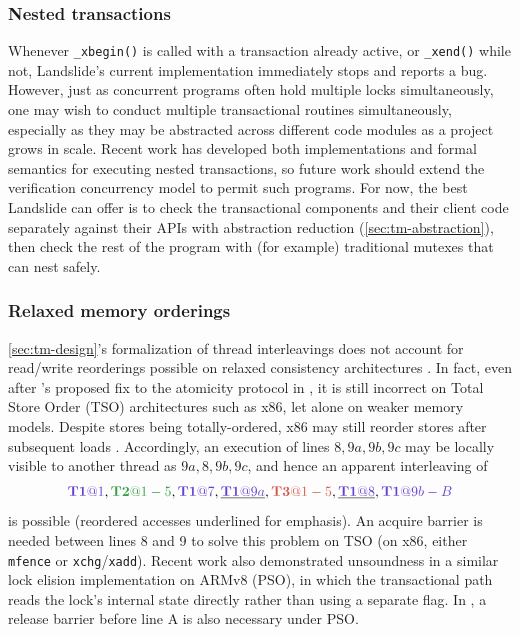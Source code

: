 \subsubsection{Nested transactions}
\label{sec:tm-warpzone-nested}

Whenever {\tt \_xbegin()} is called with a transaction already active, or {\tt \_xend()} while not,
Landslide's current implementation immediately stops and reports a bug.
However, just as concurrent programs often hold multiple locks simultaneously,
one may wish to conduct multiple transactional routines simultaneously,
especially as they may be abstracted across different code modules as a project grows in scale.
Recent work \cite{hybrid-htm-stm,relaxed-transactions-popl} has developed
both implementations and formal semantics for executing nested transactions,
so future work should extend the verification concurrency model to permit such programs.
For now, the best Landslide can offer is to check the transactional components and their client code
separately against their APIs
with abstraction reduction (\cref{sec:tm-abstraction}),
then check the rest of the program with (for example) traditional mutexes that can nest safely.

\subsubsection{Relaxed memory orderings}
\label{sec:tm-warpzone-relaxed}

\cref{sec:tm-design}'s formalization of thread interleavings does not account for read/write reorderings
possible on relaxed consistency architectures \cite{memory-consistency-models}.
In fact,
even after \cite{tm-benchmark-cmu}'s proposed fix to the atomicity protocol in ,
it is still incorrect on Total Store Order (TSO) architectures such as x86,
let alone on weaker memory models.
Despite stores being totally-ordered, x86 may still reorder stores after subsequent loads
\cite{sully-thesis}.
Accordingly, an execution of lines $8,9a,9b,9c$
may be locally visible to another thread as $9a,8,9b,9c$,
and hence an apparent interleaving of
\[
        \tiat{1},\tjat{1-5},\tiat{7},\underline{\tiat{9a}},\tkat{1-5},\underline{\tiat{8}},\tiat{9b-B}
\]
is possible
(reordered accesses underlined for emphasis).
An acquire barrier is needed between lines 8 and 9 to solve this problem on TSO \cite{tsx-need-barrier}
(on x86, either {\tt mfence} or {\tt xchg}/{\tt xadd}).
Recent work \cite{relaxed-transactions-pldi} also demonstrated unsoundness
in a similar lock elision implementation on ARMv8 (PSO),
in which the transactional path reads the lock's internal state directly
rather than using a separate flag.
In , a release barrier before line A is also necessary under PSO.

